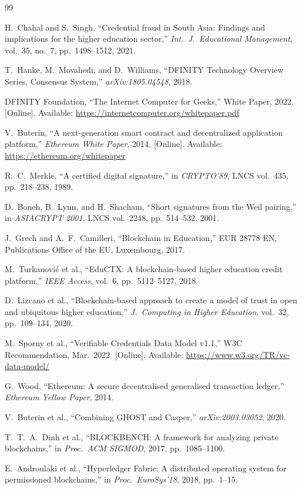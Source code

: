 \documentclass[conference]{IEEEtran}
\begin{document}
\begin{thebibliography}{99}

H.~Chahal and S.~Singh,
``Credential fraud in South Asia: Findings and implications for the higher education sector,''
\textit{Int.\ J.\ Educational Management}, vol.~35, no.~7, pp.~1498--1512, 2021.

T.~Hanke, M.~Movahedi, and D.~Williams,
``DFINITY Technology Overview Series, Consensus System,''
\textit{arXiv:1805.04548}, 2018.

DFINITY Foundation,
``The Internet Computer for Geeks,''
White Paper, 2022.
[Online]. Available: \url{https://internetcomputer.org/whitepaper.pdf}

V.~Buterin,
``A next-generation smart contract and decentralized application platform,''
\textit{Ethereum White Paper}, 2014.
[Online]. Available: \url{https://ethereum.org/whitepaper}

R.~C.~Merkle,
``A certified digital signature,''
in \textit{CRYPTO'89}, LNCS vol.~435, pp.~218--238, 1989.

D.~Boneh, B.~Lynn, and H.~Shacham,
``Short signatures from the Weil pairing,''
in \textit{ASIACRYPT 2001}, LNCS vol.~2248, pp.~514--532, 2001.

J.~Grech and A.~F.~Camilleri,
``Blockchain in Education,''
EUR 28778 EN, Publications Office of the EU, Luxembourg, 2017.

M.~Turkanovi\'{c} et al.,
``EduCTX: A blockchain-based higher education credit platform,''
\textit{IEEE Access}, vol.~6, pp.~5112--5127, 2018.

D.~Lizcano et al.,
``Blockchain-based approach to create a model of trust in open and ubiquitous higher education,''
\textit{J.\ Computing in Higher Education}, vol.~32, pp.~109--134, 2020.

M.~Sporny et al.,
``Verifiable Credentials Data Model v1.1,''
W3C Recommendation, Mar.\ 2022.
[Online]. Available: \url{https://www.w3.org/TR/vc-data-model/}

G.~Wood,
``Ethereum: A secure decentralised generalised transaction ledger,''
\textit{Ethereum Yellow Paper}, 2014.

V.~Buterin et al.,
``Combining GHOST and Casper,''
\textit{arXiv:2003.03052}, 2020.

T.~T.~A.~Dinh et al.,
``BLOCKBENCH: A framework for analyzing private blockchains,''
in \textit{Proc.\ ACM SIGMOD}, 2017, pp.~1085--1100.

E.~Androulaki et al.,
``Hyperledger Fabric: A distributed operating system for permissioned blockchains,''
in \textit{Proc.\ EuroSys'18}, 2018, pp.~1--15.

\end{thebibliography}
\end{document}
